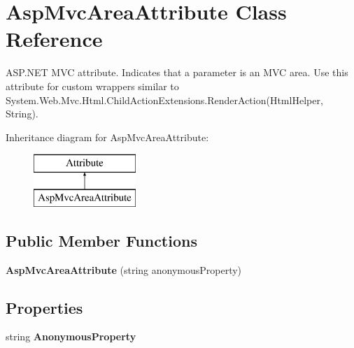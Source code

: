 \hypertarget{class_asp_mvc_area_attribute}{}\section{Asp\+Mvc\+Area\+Attribute Class Reference}
\label{class_asp_mvc_area_attribute}


A\+S\+P.\+N\+E\+T M\+V\+C attribute. Indicates that a parameter is an M\+V\+C area. Use this attribute for custom wrappers similar to {\ttfamily System.\+Web.\+Mvc.\+Html.\+Child\+Action\+Extensions.\+Render\+Action(\+Html\+Helper, String)}.  


Inheritance diagram for Asp\+Mvc\+Area\+Attribute\+:\begin{figure}[H]
\begin{center}
\leavevmode
\includegraphics[height=2.000000cm]{class_asp_mvc_area_attribute}
\end{center}
\end{figure}
\subsection*{Public Member Functions}
\begin{DoxyCompactItemize}
\item 
\hypertarget{class_asp_mvc_area_attribute_ab0b90abe9b82844d54dd498623e0674e}{}{\bfseries Asp\+Mvc\+Area\+Attribute} (string anonymous\+Property)\label{class_asp_mvc_area_attribute_ab0b90abe9b82844d54dd498623e0674e}

\end{DoxyCompactItemize}
\subsection*{Properties}
\begin{DoxyCompactItemize}
\item 
\hypertarget{class_asp_mvc_area_attribute_a035e4e50658d154dfa22d68a08425a6b}{}string {\bfseries Anonymous\+Property}\label{class_asp_mvc_area_attribute_a035e4e50658d154dfa22d68a08425a6b}

\end{DoxyCompactItemize}


